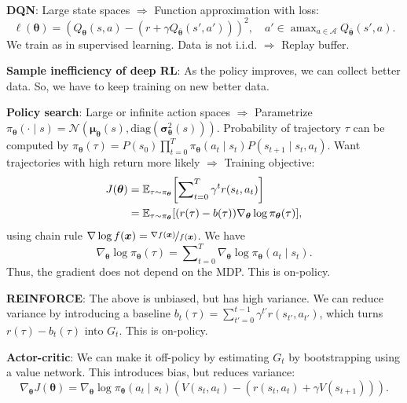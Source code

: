 \documentclass{article}
\DeclareMathOperator*{\argmax}{amax}
\newcommand{\lft}{\mathopen{}\mathclose\bgroup\left}
\newcommand{\rgt}{\aftergroup\egroup\right}
\newcommand{\E}{\mathbb{E}}
\renewcommand{\vec}[1]{\bm{#1}}
\newenvironment{topic}[1]
{\textbf{\sffamily \colorbox{black}{\rlap{\textbf{\textcolor{white}{#1}}}\hspace{\linewidth}\hspace{-2\fboxsep}}} \\ \vspace{0.2cm}}
{}
\begin{document}
\begin{multicols*}{2}
\begin{topic}{Reinforcement learning}
        \textbf{DQN}: Large state spaces $\Rightarrow$ Function approximation with loss: \[
            \ell(\vec{\theta}) = (Q_{\vec{\theta}}(s,a) - (r + \gamma Q_{\bar{\vec{\theta}}}(s', a')))^2, \quad a' \in \argmax\nolimits_{a \in \mathcal{A}} Q_{\bar{\vec{\theta}}}(s', a).
        \]
        We train as in supervised learning. Data is not i.i.d. $\Rightarrow$ Replay buffer.

        \textbf{Sample inefficiency of deep RL}: As the policy improves, we can collect better data.
        So, we have to keep training on new better data.

        \textbf{Policy search}: Large or infinite action spaces $\Rightarrow$ Parametrize $\pi_{\vec{\theta}}(\cdot \mid s) = \mathcal{N}(\vec{\mu}_{\vec{\theta}}(s), \mathrm{diag}(\vec{\sigma}_{\vec{\theta}}^2(s)))$.
        Probability of trajectory $\tau$ can be computed by $\pi_{\vec{\theta}}(\tau) = P(s_0) \prod\nolimits_{t=0}^T \pi_{\vec{\theta}}(a_t \mid s_t) P(s_{t+1} \mid s_t, a_t)$.
        Want trajectories with high return more likely $\Rightarrow$ Training objective:
        \begin{align*}
            J(\vec{\theta}) & = \E_{\tau \sim \pi_{\vec{\theta}}} \lft[ \sum\nolimits_{t=0}^{T} \gamma^t r(s_t, a_t) \rgt]                     \\
                            & = \E_{\tau \sim \pi_{\vec{\theta}}} [ (r(\tau) - b(\tau)) \nabla_{\vec{\theta}} \log \pi_{\vec{\theta}}(\tau) ],
        \end{align*}
        using chain rule $\nabla \log f(\vec{x}) = \nicefrac{\nabla f(\vec{x})}{f(\vec{x})}$. We have \[
            \nabla_{\vec{\theta}} \log \pi_{\vec{\theta}}(\tau) = \sum\nolimits_{t=0}^{T} \nabla_{\vec{\theta}} \log \pi_{\vec{\theta}}(a_t \mid s_t).
        \]
        Thus, the gradient does not depend on the MDP. This is on-policy.

        \textbf{REINFORCE}: The above is unbiased, but has high variance. We can reduce variance by
        introducing a baseline $b_t(\tau) = \sum_{t'=0}^{t-1} \gamma^{t'} r(s_{t'}, a_{t'})$, which
        turns $r(\tau) - b_t(\tau)$ into $G_t$. This is on-policy.

        \textbf{Actor-critic}: We can make it off-policy by estimating $G_t$ by bootstrapping using a value network. This introduces bias, but reduces variance: \[
            \nabla_{\vec{\theta}} J(\vec{\theta}) = \nabla_{\vec{\theta}} \log \pi_{\vec{\theta}} (a_t \mid s_t) (V(s_t, a_t) - (r(s_t, a_t) + \gamma V(s_{t+1}))).
        \]


\end{topic}
\end{multicols*}
\end{document}
